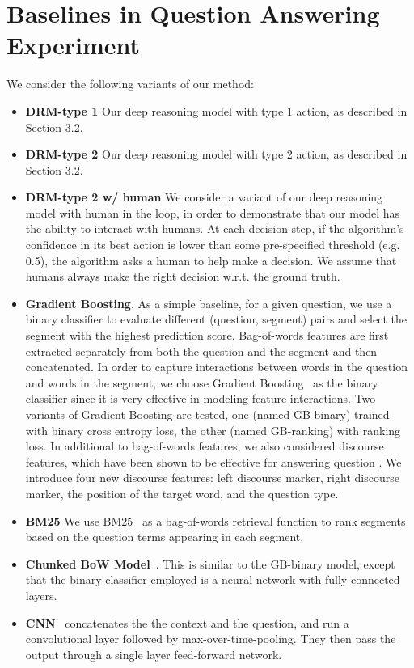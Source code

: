 \chapter{Baselines in Question Answering Experiment} \label{qa_baseline}


We consider the following variants of our method:
\begin{itemize}
\item \textbf{DRM-type 1} Our deep reasoning model with type 1 action, as described in Section 3.2.
\item \textbf{DRM-type 2} Our deep reasoning model with type 2 action, as described in Section 3.2.
\item \textbf{DRM-type 2 w/ human} We consider a variant of our deep reasoning model with human in the loop, in order to demonstrate that our model has the ability to interact with humans. At each decision step, if the algorithm's confidence in its best action is lower than some pre-specified threshold (e.g. 0.5), the algorithm asks a human to help make a decision. We assume that humans always make the right decision w.r.t. the ground truth. 
\end{itemize}

\begin{itemize}
    \item \textbf{Gradient Boosting}. As a simple baseline, for a given question, we use a binary classifier to evaluate  different (question, segment) pairs and select the segment with the highest prediction score. Bag-of-words features are first extracted separately from both the question and the segment and then concatenated. In order to capture interactions between words in the question and words in the segment, we choose Gradient Boosting~\cite{friedman2001greedy2} as the binary classifier since it is very effective in modeling feature interactions. Two variants of Gradient Boosting are tested, one (named GB-binary) trained with binary cross entropy loss, the other (named GB-ranking) with ranking loss. In additional to bag-of-words features, we also considered discourse features, which have been shown to be effective for answering question \cite{DBLP:conf/acl/JansenSC14,DBLP:conf/acl/NarasimhanB15}. We introduce four new discourse features: left discourse marker, right discourse marker, the position of the target word, and the question type.
    \item \textbf{BM25} We use BM25~\cite{DBLP:journals/ftir/RobertsonZ09} as a bag-of-words retrieval function to rank segments based on the question terms appearing in each segment.
    
    \item \textbf{Chunked BoW Model}~\cite{DBLP:conf/acl/ChoiHUPLB17}. This is similar to the GB-binary model, except that the binary classifier employed is a neural network with fully connected layers.
    \item \textbf{CNN}~\cite{DBLP:conf/acl/ChoiHUPLB17}  concatenates
the the context and the question, and run a convolutional layer followed by max-over-time-pooling. They then pass the output through a single layer feed-forward network.
\end{itemize}

